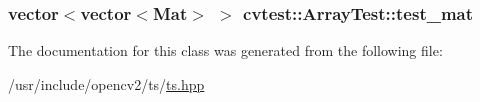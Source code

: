 \hypertarget{classcvtest_1_1ArrayTest_a9f221cafbb615b279aa697e18b42c26e}{
\subsubsection[{test\-\_\-mat}]{\setlength{\rightskip}{0pt plus 5cm}vector$<$vector$<$Mat$>$ $>$ cvtest\-::\-Array\-Test\-::test\-\_\-mat\hspace{0.3cm}{\ttfamily [protected]}}}\label{classcvtest_1_1ArrayTest_a9f221cafbb615b279aa697e18b42c26e}


The documentation for this class was generated from the following file\-:\begin{DoxyCompactItemize}
\item 
/usr/include/opencv2/ts/\hyperlink{ts_8hpp}{ts.\-hpp}\end{DoxyCompactItemize}
